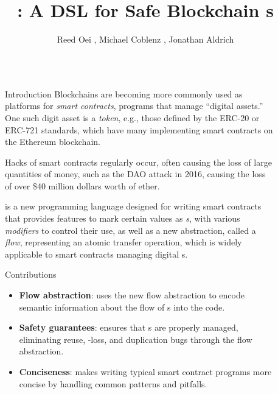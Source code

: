 \documentclass[usenames, dvipsnames, final]{beamer}
\title{\langName: A DSL for Safe Blockchain \AssetTxt{}s}
\author{Reed Oei \inst{1}, Michael Coblenz \inst{2}, Jonathan Aldrich \inst{2}}
\institute[shortinst]{\inst{1} University of Illinois \samelineand \inst{2} Carnegie Mellon University}
\newlength{\sepwidth}
\newlength{\colwidth}
\newcommand{\separatorcolumn}{\begin{column}{\sepwidth}\end{column}}
\begin{document}
\begin{frame}[t]
\begin{columns}[t]
\separatorcolumn

\begin{column}{\colwidth}

  \begin{block}{Introduction}
      Blockchains are becoming more commonly used as platforms for \emph{smart contracts}, programs that manage ``digital assets.''
      One such digit asset is a \emph{token}, e.g., those defined by the ERC-20 or ERC-721 standards, which have many implementing smart contracts on the Ethereum blockchain.

      Hacks of smart contracts regularly occur, often causing the loss of large quantities of money, such as the DAO attack in 2016, causing the loss of over \$40 million dollars worth of ether.

      \langName is a new programming language designed for writing smart contracts that provides features to mark certain values as \emph{\assetTxt{}s}, with various \emph{modifiers} to control their use, as well as a new abstraction, called a \emph{flow}, representing an atomic transfer operation, which is widely applicable to smart contracts managing digital \assetTxt{}s.
  \end{block}

    \begin{alertblock}{Contributions}
      \begin{itemize}
          \item \textbf{Flow abstraction}: \langName uses the new flow abstraction to encode semantic information about the flow of \assetTxt{}s into the code.
          \item \textbf{Safety guarantees}: \langName ensures that \assetTxt{}s are properly managed, eliminating reuse, \assetTxt-loss, and duplication bugs through the flow abstraction.
          \item \textbf{Conciseness}: \langName makes writing typical smart contract programs more concise by handling common patterns and pitfalls.
      \end{itemize}
    \end{alertblock}
\end{column}

\separatorcolumn

\begin{column}{\colwidth}


\end{column}
\end{columns}
\end{frame}
\end{document}
